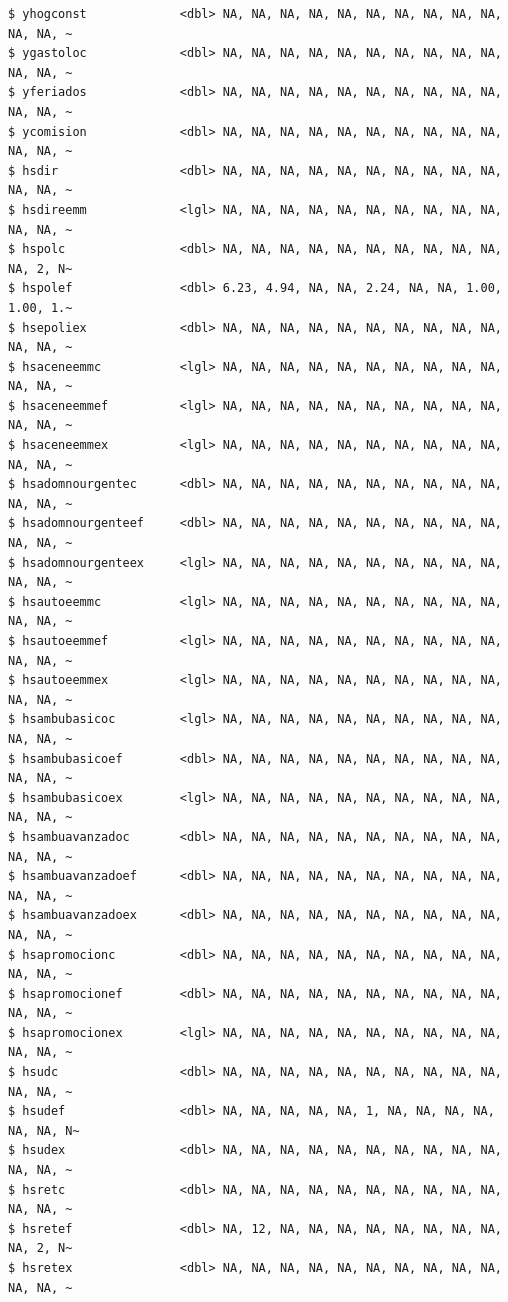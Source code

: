 \documentclass[
  letterpaper,
  DIV=11,
  numbers=noendperiod]{scrreprt}
\begin{document}
\begin{verbatim}
$ yhogconst             <dbl> NA, NA, NA, NA, NA, NA, NA, NA, NA, NA, NA, NA, ~
$ ygastoloc             <dbl> NA, NA, NA, NA, NA, NA, NA, NA, NA, NA, NA, NA, ~
$ yferiados             <dbl> NA, NA, NA, NA, NA, NA, NA, NA, NA, NA, NA, NA, ~
$ ycomision             <dbl> NA, NA, NA, NA, NA, NA, NA, NA, NA, NA, NA, NA, ~
$ hsdir                 <dbl> NA, NA, NA, NA, NA, NA, NA, NA, NA, NA, NA, NA, ~
$ hsdireemm             <lgl> NA, NA, NA, NA, NA, NA, NA, NA, NA, NA, NA, NA, ~
$ hspolc                <dbl> NA, NA, NA, NA, NA, NA, NA, NA, NA, NA, NA, 2, N~
$ hspolef               <dbl> 6.23, 4.94, NA, NA, 2.24, NA, NA, 1.00, 1.00, 1.~
$ hsepoliex             <dbl> NA, NA, NA, NA, NA, NA, NA, NA, NA, NA, NA, NA, ~
$ hsaceneemmc           <lgl> NA, NA, NA, NA, NA, NA, NA, NA, NA, NA, NA, NA, ~
$ hsaceneemmef          <lgl> NA, NA, NA, NA, NA, NA, NA, NA, NA, NA, NA, NA, ~
$ hsaceneemmex          <lgl> NA, NA, NA, NA, NA, NA, NA, NA, NA, NA, NA, NA, ~
$ hsadomnourgentec      <dbl> NA, NA, NA, NA, NA, NA, NA, NA, NA, NA, NA, NA, ~
$ hsadomnourgenteef     <dbl> NA, NA, NA, NA, NA, NA, NA, NA, NA, NA, NA, NA, ~
$ hsadomnourgenteex     <lgl> NA, NA, NA, NA, NA, NA, NA, NA, NA, NA, NA, NA, ~
$ hsautoeemmc           <lgl> NA, NA, NA, NA, NA, NA, NA, NA, NA, NA, NA, NA, ~
$ hsautoeemmef          <lgl> NA, NA, NA, NA, NA, NA, NA, NA, NA, NA, NA, NA, ~
$ hsautoeemmex          <lgl> NA, NA, NA, NA, NA, NA, NA, NA, NA, NA, NA, NA, ~
$ hsambubasicoc         <lgl> NA, NA, NA, NA, NA, NA, NA, NA, NA, NA, NA, NA, ~
$ hsambubasicoef        <dbl> NA, NA, NA, NA, NA, NA, NA, NA, NA, NA, NA, NA, ~
$ hsambubasicoex        <lgl> NA, NA, NA, NA, NA, NA, NA, NA, NA, NA, NA, NA, ~
$ hsambuavanzadoc       <dbl> NA, NA, NA, NA, NA, NA, NA, NA, NA, NA, NA, NA, ~
$ hsambuavanzadoef      <dbl> NA, NA, NA, NA, NA, NA, NA, NA, NA, NA, NA, NA, ~
$ hsambuavanzadoex      <dbl> NA, NA, NA, NA, NA, NA, NA, NA, NA, NA, NA, NA, ~
$ hsapromocionc         <dbl> NA, NA, NA, NA, NA, NA, NA, NA, NA, NA, NA, NA, ~
$ hsapromocionef        <dbl> NA, NA, NA, NA, NA, NA, NA, NA, NA, NA, NA, NA, ~
$ hsapromocionex        <lgl> NA, NA, NA, NA, NA, NA, NA, NA, NA, NA, NA, NA, ~
$ hsudc                 <dbl> NA, NA, NA, NA, NA, NA, NA, NA, NA, NA, NA, NA, ~
$ hsudef                <dbl> NA, NA, NA, NA, NA, 1, NA, NA, NA, NA, NA, NA, N~
$ hsudex                <dbl> NA, NA, NA, NA, NA, NA, NA, NA, NA, NA, NA, NA, ~
$ hsretc                <dbl> NA, NA, NA, NA, NA, NA, NA, NA, NA, NA, NA, NA, ~
$ hsretef               <dbl> NA, 12, NA, NA, NA, NA, NA, NA, NA, NA, NA, 2, N~
$ hsretex               <dbl> NA, NA, NA, NA, NA, NA, NA, NA, NA, NA, NA, NA, ~

\end{verbatim}
\end{document}
